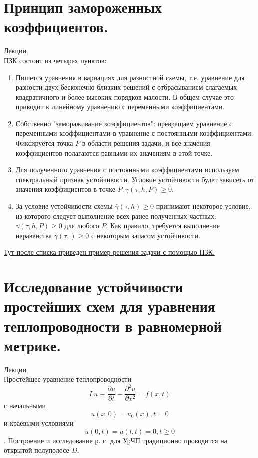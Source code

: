 \documentclass[specialist, subf, href, colorlinks=true, 12pt, times, mtpro, final]{disser}
\theoremstyle{definition}
\begin{document}
{\section {Принцип замороженных коэффициентов.}
    \hyperlink {lects.132}{Лекции}\\
    ПЗК состоит из четырех пунктов:
    \begin{enumerate} 
    	\item Пишется уравнения в вариациях для разностной схемы, т.е. уравнение для разности двух бесконечно близких решений с отбрасыванием слагаемых квадратичного и более высоких порядков малости. В общем случае это приводит к линейному уравнению с переменными коэффициентами.
    	\item Собственно "замораживание коэффициентов": превращаем уравнение с переменными коэффициентами в уравнение с постоянными коэффициентами. Фиксируется точка $P$ в области решения задачи, и все значения коэффициентов полагаются равными их значениям в этой точке.
    	\item Для полученного уравнения с постоянными коэффициентами используем спектральный признак устойчивости. Условие устойчивости будет зависеть от значения коэффициентов в точке $P: \gamma(\tau, h, P) \geqslant 0$.
    	\item За условие устойчивости схемы $\overline{\gamma}(\tau,h) \geqslant 0$ принимают некоторое условие, из которого следует выполнение всех ранее полученных частных: $\gamma(\tau, h, P) \geqslant 0$ для любого $P$. Как правило, требуется выполнение неравенства $\overline{\gamma}(\tau, ) \geqslant 0 $ с некоторым запасом устойчивости.
    \end{enumerate}
    
    \hyperlink {lects.132}{Тут после списка приведен пример решения задачи с помощью ПЗК.}\\

\section {Исследование устойчивости простейших схем для уравнения теплопроводности в равномерной метрике.}
    \hyperlink {lects.134}{Лекции}\\
    Простейшее уравнение теплопроводности
    $$Lu \equiv \frac{\partial u}{\partial t} - \frac{\partial^2 u}{\partial x^2} = f(x,t)$$
    с начальными 
    $$u(x,0) = u_0(x), t = 0$$
    и краевыми условиями
    $$u(0,t) = u(l,t) = 0, t \geqslant 0$$.
    Построение и исследование р. с. для УрЧП традиционно проводится на открытой полуполосе $D$.
    
}
\end{document}
